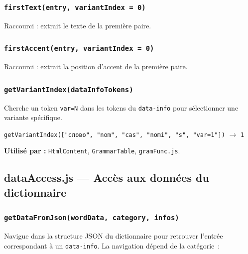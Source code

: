 \subsubsection{\texttt{firstText(entry, variantIndex = 0)}}

Raccourci : extrait le texte de la première paire.

\subsubsection{\texttt{firstAccent(entry, variantIndex = 0)}}

Raccourci : extrait la position d'accent de la première paire.

\subsubsection{\texttt{getVariantIndex(dataInfoTokens)}}

Cherche un token \texttt{var=N} dans les tokens du \texttt{data-info} pour sélectionner une variante spécifique.

\begin{ukrbox}
\texttt{getVariantIndex(["слово", "nom", "cas", "nomi", "s", "var=1"])} $\rightarrow$ \texttt{1}
\end{ukrbox}

\textbf{Utilisé par :} \texttt{HtmlContent}, \texttt{GrammarTable}, \texttt{gramFunc.js}.

\subsection{dataAccess.js --- Accès aux données du dictionnaire}

\subsubsection{\texttt{getDataFromJson(wordData, category, infos)}}

Navigue dans la structure JSON du dictionnaire pour retrouver l'entrée correspondant à un \texttt{data-info}. La navigation dépend de la catégorie~:

